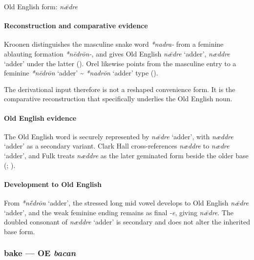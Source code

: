 \documentclass[
  british,
  a4paper,
]{article}
\providecommand{\Recon}[1]{\emph{*#1}}
\begin{document}
Old English form: \emph{nǣdre}

\paragraph{Reconstruction and comparative
evidence}\label{reconstruction-and-comparative-evidence}

Kroonen distinguishes the masculine snake word {\emph{*nadra-}} from a
feminine ablauting formation {\emph{*nēdrōn-}}, and gives Old English
{\emph{nǣdre}} `adder', {\emph{næddre}} `adder' under the latter
(). Orel likewise points
from the masculine entry to a feminine \Recon{nēdrōn} `adder'
\textasciitilde{} \Recon{nadrōn} `adder' type
().

The derivational input therefore is not a reshaped convenience form. It
is the comparative reconstruction that specifically underlies the Old
English noun.

\paragraph{Old English evidence}\label{old-english-evidence}

The Old English word is securely represented by {\emph{nǣdre}} `adder',
with {\emph{næddre}} `adder' as a secondary variant. Clark Hall
cross-references {\emph{næddre}} to {\emph{nædre}} `adder', and Fulk
treats {\emph{næddre}} as the later geminated form beside the older base
(;
).

\paragraph{Development to Old English}\label{development-to-old-english}

From \Recon{nḗdrōn} `adder', the stressed long mid vowel develops to Old
English {\emph{nǣdre}} `adder', and the weak feminine ending remains as
final \emph{-e}, giving {\emph{nǣdre}}. The doubled consonant of
{\emph{næddre}} `adder' is secondary and does not alter the inherited
base form.

\subsubsection{\texorpdfstring{bake --- OE
\emph{bacan}}{bake --- OE bacan}}\label{bake-oe-bacan}
\end{document}

